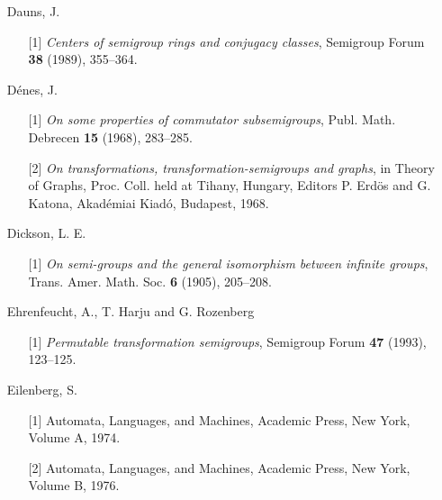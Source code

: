 \documentclass{surv-l}
\numberwithin{equation}{section}
\numberwithin{table}{section}
\numberwithin{figure}{section}
\theoremstyle{definition}
\begin{document}
\begin{enumerate}
\item[] Dauns, J.
\begin{enumerate}
\item[\hypertarget{bib10}{[1]}] \emph{Centers of semigroup rings and conjugacy
classes}, Semigroup Forum \textbf{38} (1989), 355--364.
\end{enumerate}

\item[] D\'{e}nes, J.
\begin{enumerate}
\item[\hypertarget{bib11}{[1]}] \emph{On some properties of commutator subsemigroups},
Publ. Math. Debrecen \textbf{15} (1968), 283--285.

\item[\hypertarget{bib11a}{[2]}] \emph{On transformations, transformation-semigroups and
graphs}, in Theory of Graphs, Proc. Coll. held at Tihany,
Hungary, Editors P. Erd\"{o}s and G. Katona, Akad\'{e}miai
Kiad\'{o}, Budapest, 1968.
\end{enumerate}

\item[] Dickson, L. E.
\begin{enumerate}
\item[\hypertarget{bib12}{[1]}] \emph{On semi-groups and the general isomorphism
between infinite groups}, Trans. Amer. Math. Soc.
\textbf{6} (1905), 205--208.
\end{enumerate}

\item[] Ehrenfeucht, A., T. Harju and G. Rozenberg
\begin{enumerate}
\item[\hypertarget{bib13}{[1]}] \emph{Permutable transformation semigroups}, Semigroup
Forum \textbf{47} (1993), 123--125.
\end{enumerate}

\item[] Eilenberg, S.
\begin{enumerate}
\item[\hypertarget{bib14}{[1]}] Automata, Languages, and Machines, Academic Press, New
York, Volume A, 1974.

\item[\hypertarget{bib14a}{[2]}] Automata, Languages, and Machines, Academic Press, New
York, Volume B, 1976.
\end{enumerate}


\end{enumerate}
\end{document}
